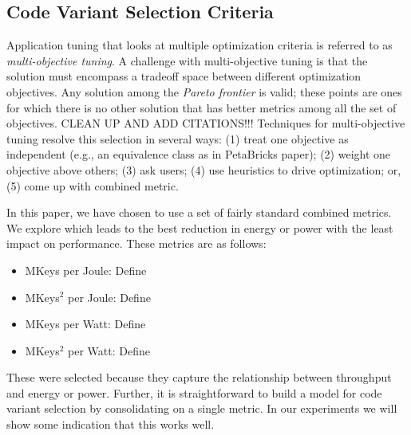 \subsection{Code Variant Selection Criteria}
Application tuning that looks at multiple optimization criteria
is referred to as \emph{multi-objective tuning}.
A challenge with multi-objective tuning is that the solution must encompass
a tradeoff space between different optimization objectives.  Any 
solution among the \emph{Pareto frontier} is valid; these points are ones
for which there is no other solution that has better metrics among
all the set of objectives.
{\color{red} CLEAN UP AND ADD CITATIONS!!!
Techniques for multi-objective tuning resolve this selection in several
ways:
(1) treat one objective as independent (e.g., an equivalence class
as in PetaBricks paper);  (2) weight one objective above others; 
(3) ask users; (4) use heuristics to drive optimization; or, (5) come up with combined metric.}

In this paper, we have chosen to use a set of fairly standard combined metrics.
We explore which leads to the best reduction in energy or power with the least
impact on performance.  These metrics are as follows: 
\begin{itemize}
\item MKeys per Joule: {\color{red} Define}
\item MKeys$^2$ per Joule: {\color{red} Define}
\item MKeys per Watt: {\color{red} Define}
\item MKeys$^2$ per Watt: {\color{red} Define}
\end{itemize}
These were selected because they capture the relationship between throughput
and energy or power.  Further, it is straightforward to build a model 
for code variant selection by consolidating on a single metric.
In our experiments we will show {\color{red} some indication that this works well.}
